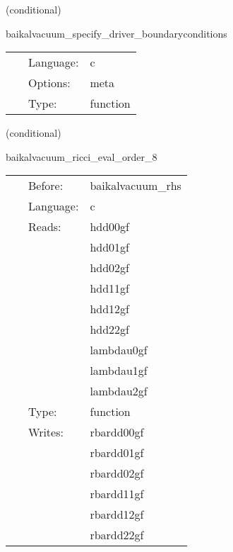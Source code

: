 \vspace{5mm}

   (conditional) 

\hspace{5mm} baikalvacuum\_specify\_driver\_boundaryconditions 

\hspace{5mm}{\it register boundary conditions in presync bin driver\_boundaryselect. } 


\hspace{5mm}

 \begin{tabular*}{160mm}{cll} 
~ & Language:  & c \\ 
~ & Options:  & meta \\ 
~ & Type:  & function \\ 
\end{tabular*} 


\vspace{5mm}

   (conditional) 

\hspace{5mm} baikalvacuum\_ricci\_eval\_order\_8 

\hspace{5mm}{\it compute ricci tensor, needed for bssn rhss, at finite-differencing order 8 } 


\hspace{5mm}

 \begin{tabular*}{160mm}{cll} 
~ & Before:  & baikalvacuum\_rhs \\ 
~ & Language:  & c \\ 
~ & Reads:  & hdd00gf \\ 
~& ~ &hdd01gf\\ 
~& ~ &hdd02gf\\ 
~& ~ &hdd11gf\\ 
~& ~ &hdd12gf\\ 
~& ~ &hdd22gf\\ 
~& ~ &lambdau0gf\\ 
~& ~ &lambdau1gf\\ 
~& ~ &lambdau2gf\\ 
~ & Type:  & function \\ 
~ & Writes:  & rbardd00gf \\ 
~& ~ &rbardd01gf\\ 
~& ~ &rbardd02gf\\ 
~& ~ &rbardd11gf\\ 
~& ~ &rbardd12gf\\ 
~& ~ &rbardd22gf\\ 
\end{tabular*} 


